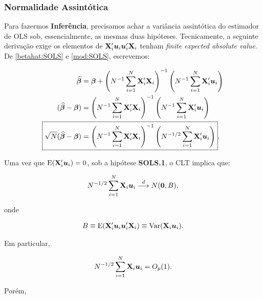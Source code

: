 \documentclass[11pt, oneside, a4paper, article]{article}
\numberwithin{equation}{section}
\begin{document}
\subsubsection{Normalidade Assintótica}

Para fazermos \textbf{Inferência}, precisamos achar a variância assintótica do estimador de OLS sob, essencialmente, as mesmas duas hipóteses. 
Tecnicamente, a seguinte derivação exige os elementos de
$\mathbf{X}_{i}' \boldsymbol{u}_{i} \boldsymbol{u}_{i}' \mathbf{X}_{i}$
tenham \textit{finite expected absolute value}.
De \eqref{betahat:SOLS} e \eqref{mod:SOLS}, escrevemos:

\vspace{-1 em}
\begin{align*} 
\betahatbold  &=
\betavec +
\left( N^{-1} \sum_{i=1}^{N} \Xmat_{i}' \Xmat_{i}   \right)^{-1}
\left( N^{-1} \sum_{i=1}^{N} \Xmat_{i}' \mbs{u}_{i}   \right)
\\ 
(\betahatbold - \betavec) &= 
\left( N^{-1} \sum_{i=1}^{N} \Xmat_{i}' \Xmat_{i}   \right)^{-1}
\left( N^{-1} \sum_{i=1}^{N} \Xmat_{i}' \mbs{u}_{i}   \right)
\\ 
\Aboxed{
\sqrt{N}(\betahatbold - \betavec) &= 
\left( N^{-1} \sum_{i=1}^{N} \Xmat_{i}' \Xmat_{i}   \right)^{-1}
\left( N^{-1/2} \sum_{i=1}^{N} \Xmat_{i}' \mbs{u}_{i}   \right)
}.
\end{align*}

Uma vez que $\text{E}(\mathbf{X}_{i}' \boldsymbol{u}_{i})=0$, sob a hipótese \textbf{SOLS.1}, o CLT implica que:

\vspace{-1 em}
\begin{align*} 
N^{-1/2} \sum_{i=1}^{N} \mathbf{X}_{i} \boldsymbol{u}_{i}  \overset{d}{\longrightarrow}  N(\boldsymbol{0}, B),
\end{align*}

\noindent
onde

\vspace{-1 em}
\begin{align*} 
B \equiv \text{E}(\mathbf{X}_{i}' \boldsymbol{u}_{i} \boldsymbol{u}_{i}' \mathbf{X}_{i}) \equiv \text{Var}(\mathbf{X}_{i} \boldsymbol{u}_{i}).
\end{align*}

\noindent
Em particular,

\vspace{-1 em}
\begin{align*} 
N^{-1/2} \sum_{i=1}^{N} \mathbf{X}_{i} \boldsymbol{u}_{i} = O_{p}(1).
\end{align*}

Porém,
\end{document}
